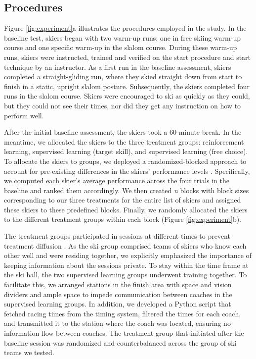 \documentclass[pdflatex,sn-mathphys-num]{sn-jnl}%
\theoremstyle{thmstyleone}%
\theoremstyle{thmstyletwo}%
\theoremstyle{thmstylethree}%
\begin{document}
\subsection{Procedures}\label{subsec4}
Figure \ref{fig:experiment}a illustrates the procedures employed in the study. 
In the baseline test, skiers began with two warm-up runs: one in free skiing warm-up course and one specific warm-up in the slalom course. During these warm-up runs, skiers were instructed, trained and verified on the start procedure and start technique by an instructor. As a first run in the baseline assessment, skiers completed a straight-gliding run, where they skied straight down from start to finish in a static, upright slalom posture. Subsequently, the skiers completed four runs in the slalom course. Skiers were encouraged to ski as quickly as they could, but they could not see their times, nor did they get any instruction on how to perform well. 

After the initial baseline assessment, the skiers took a 60-minute break. In the meantime, we allocated the skiers to the three treatment groups: reinforcement learning, supervised learning (target skill), and supervised learning (free choice). To allocate the skiers to groups, we deployed a randomized-blocked approach to account for pre-existing differences in the skiers’ performance levels \cite{maxwell_designing_2017}. Specifically, we computed each skier’s average performance across the four trials in the baseline and ranked them accordingly. We then created \textit{n} blocks with block sizes corresponding to our three treatments for the entire list of skiers and assigned these skiers to these predefined blocks. Finally, we randomly allocated the skiers to the different treatment groups within each block (Figure \ref{fig:experiment}b).

The treatment groups participated in sessions at different times to prevent treatment diffusion \cite{maxwell_designing_2017}. As the ski group comprised teams of skiers who know each other well and were residing together, we explicitly emphasized the importance of keeping information about the sessions private. To stay within the time frame at the ski hall, the two supervised learning groups underwent training together. To facilitate this, we arranged stations in the finish area with space and vision dividers and ample space to impede communication between coaches in the supervised learning groups. In addition, we developed a Python script that fetched racing times from the timing system, filtered the times for each coach, and transmitted it to the station where the coach was located, ensuring no information flow between coaches. The treatment group that initiated after the baseline session was randomized and counterbalanced across the group of ski teams we tested.
\end{document}
